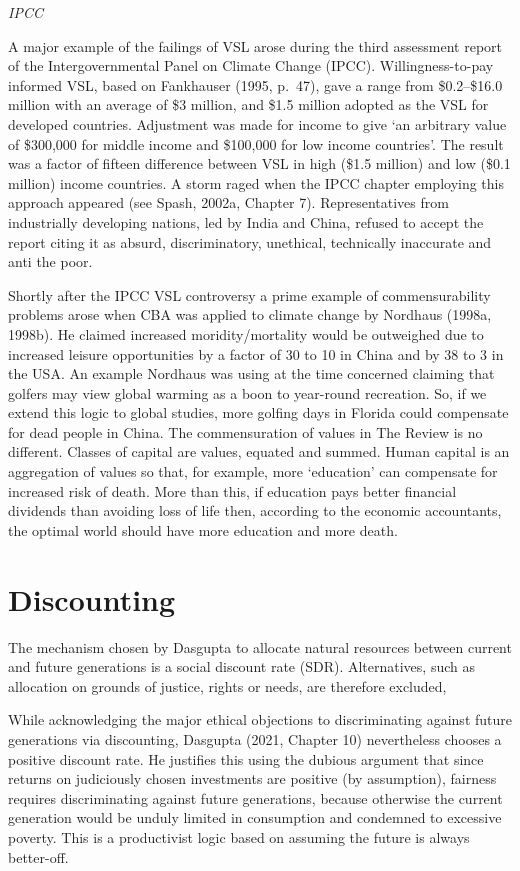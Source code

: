 \documentclass[
]{book}
\begin{document}
\emph{IPCC}

A major example of the failings of VSL arose during the third assessment report of the
Intergovernmental Panel on Climate Change (IPCC). Willingness-to-pay informed VSL, based on
Fankhauser (1995, p.~47), gave a range from \$0.2--\$16.0 million with an average of \$3 million, and
\$1.5 million adopted as the VSL for developed countries. Adjustment was made for income to
give `an arbitrary value of \$300,000 for middle income and \$100,000 for low income countries'.
The result was a factor of fifteen difference between VSL in high (\$1.5 million) and low (\$0.1
million) income countries. A storm raged when the IPCC chapter employing this approach
appeared (see Spash, 2002a, Chapter 7). Representatives from industrially developing nations,
led by India and China, refused to accept the report citing it as absurd, discriminatory, unethical,
technically inaccurate and anti the poor.

Shortly after the IPCC VSL controversy a prime example of commensurability problems arose
when CBA was applied to climate change by Nordhaus (1998a, 1998b). He claimed increased
moridity/mortality would be outweighed due to increased leisure opportunities by a factor of 30 to 10
in China and by 38 to 3 in the USA. An example Nordhaus was using at the time concerned claiming
that golfers may view global warming as a boon to year-round recreation. So, if we extend this
logic to global studies, more golfing days in Florida could compensate for dead people in China.
The commensuration of values in The Review is no different. Classes of capital are values,
equated and summed. Human capital is an aggregation of values so that, for example, more `education'
can compensate for increased risk of death. More than this, if education pays better financial
dividends than avoiding loss of life then, according to the economic accountants, the optimal world
should have more education and more death.

\hypertarget{discounting-1}{%
\section{Discounting}\label{discounting-1}}

The mechanism chosen by Dasgupta to allocate natural resources between current and future
generations is a social discount rate (SDR). Alternatives, such as allocation on grounds of justice, rights
or needs, are therefore excluded,

While acknowledging the major ethical objections to discriminating against future
generations via discounting, Dasgupta (2021, Chapter 10) nevertheless chooses a positive discount
rate. He justifies this using the dubious argument that since returns on judiciously chosen
investments are positive (by assumption), fairness requires discriminating against future generations,
because otherwise the current generation would be unduly limited in consumption and condemned
to excessive poverty. This is a productivist logic based on assuming the future is always better-off.
\end{document}
